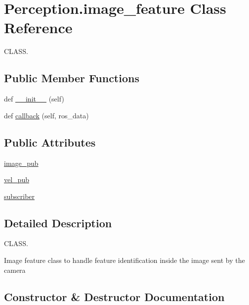 \hypertarget{classPerception_1_1image__feature}{}\section{Perception.\+image\+\_\+feature Class Reference}
\label{classPerception_1_1image__feature}


C\+L\+A\+SS.  


\subsection*{Public Member Functions}
\begin{DoxyCompactItemize}
\item 
def \hyperlink{classPerception_1_1image__feature_a748b3574bea982b0e5b29a86dfca644e}{\+\_\+\+\_\+init\+\_\+\+\_\+} (self)
\item 
def \hyperlink{classPerception_1_1image__feature_aa4163f3a9600d001cfd6ac90ba460df9}{callback} (self, ros\+\_\+data)
\end{DoxyCompactItemize}
\subsection*{Public Attributes}
\begin{DoxyCompactItemize}
\item 
\hyperlink{classPerception_1_1image__feature_acfc602315032d7e877533594d93ed051}{image\+\_\+pub}
\item 
\hyperlink{classPerception_1_1image__feature_a2582bcb9aca24ef19e5a249684048c84}{vel\+\_\+pub}
\item 
\hyperlink{classPerception_1_1image__feature_a73606194793aca7799100ae95535b072}{subscriber}
\end{DoxyCompactItemize}


\subsection{Detailed Description}
C\+L\+A\+SS. 

Image feature class to handle feature identification inside the image sent by the camera 

\subsection{Constructor \& Destructor Documentation}
